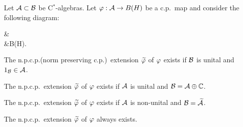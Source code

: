 \documentclass{../../../small}
\begin{document}
\begin{thm}
Let $\mathcal{A}\subset\mathcal{B}$ be C$^*$-algebras.
Let $\varphi:\mathcal{A}\to B(H)$ be a c.p.~map and consider the following diagram:
\begin{cd}
\cB{}&\\
\cA{}&B(H).
\end{cd}
\begin{parts}
\item The n.p.c.p.(norm preserving c.p.)~extension $\widetilde{\varphi}$ of $\varphi$ exists if $\mathcal{B}$ is unital and $1_{\mathcal{B}}\in\mathcal{A}$.
\item The n.p.c.p.~extension $\widetilde{\varphi}$ of $\varphi$ exists if $\mathcal{A}$ is unital and $\mathcal{B}=\mathcal{A}\oplus\mathbb{C}$.
\item The n.p.c.p.~extension $\widetilde{\varphi}$ of $\varphi$ exists if $\mathcal{A}$ is non-unital and $\mathcal{B}=\widetilde{\mathcal{A}}$.
\item The n.p.c.p.~extension $\widetilde{\varphi}$ of $\varphi$ always exists.
\end{parts}
\end{thm}
\end{document}

